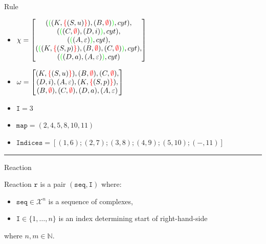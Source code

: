 \documentclass[12pt]{fithesis2}
\begin{document}
\begin{example}{Rule}\label{example:rule}

\begin{itemize}
\item 
$\chi = \begin{bmatrix}
(\textcolor{green}{(} (K, \textcolor{red}{\{}(S, u)\textcolor{red}{\}}), (B, \textcolor{red}{\emptyset}) \textcolor{green}{)}, cyt),\\

(\textcolor{green}{(} (C, \textcolor{red}{\emptyset}), (D, i) \textcolor{green}{)}, cyt),\\

(\textcolor{green}{(} (A, \varepsilon) \textcolor{green}{)}, cyt),\\

(\textcolor{green}{(} (K, \textcolor{red}{\{}(S, p)\textcolor{red}{\}}), (B, \textcolor{red}{\emptyset}), (C, \textcolor{red}{\emptyset}) \textcolor{green}{)}, cyt),\\

(\textcolor{green}{(} (D, a), (A, \varepsilon) \textcolor{green}{)}, cyt) 
\end{bmatrix}$

\item $\omega = \begin{bmatrix}
(K, \textcolor{red}{\{}(S, u)\textcolor{red}{\}}), (B, \textcolor{red}{\emptyset}), (C, \textcolor{red}{\emptyset}), \\
(D, i), (A, \varepsilon), (K, \textcolor{red}{\{}(S, p)\textcolor{red}{\}}), \\
(B, \textcolor{red}{\emptyset}), (C, \textcolor{red}{\emptyset}), (D, a), (A, \varepsilon)
\end{bmatrix}$

\item $\mathtt{I} = 3$
\item $\mathtt{map} = (2,4,5,8,10,11)$
\item $\mathtt{Indices} = [ (1,6) ; (2,7) ; (3,8) ; (4,9) ; (5,10) ; (-,11) ] $
\end{itemize}
\end{example}

\noindent\rule{\textwidth}{1pt}

\begin{definition}{Reaction}

Reaction $\mathtt{r}$ is a pair $(\mathtt{seq}, \mathtt{I})$ where:

\begin{itemize}
\item $\mathtt{seq} \in \mathcal{X}^n$ is a sequence of complexes,
\item $\mathtt{I} \in \{ 1, \ldots, n \}$ is an index determining start of right-hand-side
\end{itemize}

where $n, m \in \mathbb{N}$.
\end{definition}
\end{document}
